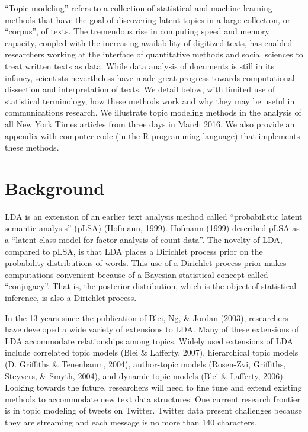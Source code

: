 \documentclass[12pt,]{article}
\begin{document}
``Topic modeling'' refers to a collection of statistical and machine
learning methods that have the goal of discovering latent topics in a
large collection, or ``corpus'', of texts. The tremendous rise in
computing speed and memory capacity, coupled with the increasing
availability of digitized texts, has enabled researchers working at the
interface of quantitative methods and social sciences to treat written
texts as data. While data analysis of documents is still in its infancy,
scientists nevertheless have made great progress towards computational
dissection and interpretation of texts. We detail below, with limited
use of statistical terminology, how these methods work and why they may
be useful in communications research. We illustrate topic modeling
methods in the analysis of all New York Times articles from three days
in March 2016. We also provide an appendix with computer code (in the R
programming language) that implements these methods.

\section{Background}\label{background}

LDA is an extension of an earlier text analysis method called
``probabilistic latent semantic analysis'' (pLSA) (Hofmann, 1999).
Hofmann (1999) described pLSA as a ``latent class model for factor
analysis of count data''. The novelty of LDA, compared to pLSA, is that
LDA places a Dirichlet process prior on the probability distributions of
words. This use of a Dirichlet process prior makes computations
convenient because of a Bayesian statistical concept called
``conjugacy''. That is, the posterior distribution, which is the object
of statistical inference, is also a Dirichlet process.

In the 13 years since the publication of Blei, Ng, \& Jordan (2003),
researchers have developed a wide variety of extensions to LDA. Many of
these extensions of LDA accommodate relationships among topics. Widely
used extensions of LDA include correlated topic models (Blei \&
Lafferty, 2007), hierarchical topic models (D. Griffiths \& Tenenbaum,
2004), author-topic models (Rosen-Zvi, Griffiths, Steyvers, \& Smyth,
2004), and dynamic topic models (Blei \& Lafferty, 2006). Looking
towards the future, researchers will need to fine tune and extend
existing methods to accommodate new text data structures. One current
research frontier is in topic modeling of tweets on Twitter. Twitter
data present challenges because they are streaming and each message is
no more than 140 characters.
\end{document}
